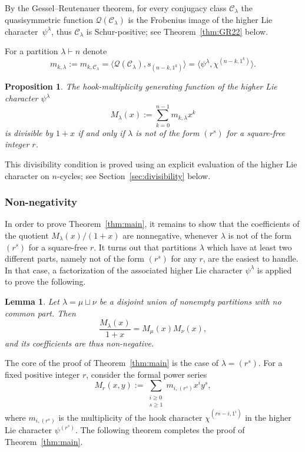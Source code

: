 \documentclass[10pt]{article}
\newtheorem{lemma}[theorem]{Lemma}
\newtheorem{proposition}[theorem]{Proposition}
\theoremstyle{definition}
\newcommand{\Q}{\mathcal Q}
\newcommand{\C}{\mathcal C}
\begin{document}
By the 
Gessel--Reutenauer theorem, 
for every conjugacy class $\C_\lambda$ 
the quasisymmetric function 
$\Q(\C_\lambda)$ is the Frobenius image of the higher Lie character~$\psi^\lambda$, thus  $\C_\lambda$ is  Schur-positive; 
see Theorem~\ref{thm:GR22} below.

For a partition $\lambda \vdash n$ denote
\begin{equation}\label{notation:m_k_hLc}
m_{k,\lambda} := m_{k,\C_\lambda}
= \langle \Q(\C_\lambda), s_{(n-k,1^k)} \rangle
= \langle \psi^\lambda, \chi^{(n-k,1^k)} \rangle.
\end{equation}
    
\begin{proposition}\label{prop:divisibility} 
    The hook-multiplicity generating function of the higher Lie character $\psi^\lambda$
    \[
        M_\lambda(x):=\sum\limits_{k=0}^{n-1}m_{k,\lambda}x^k
    \]
    is divisible by $1+x$ 
    if and only if $\lambda$ is not of the form $(r^s)$ for a square-free integer $r$.
\end{proposition}

This divisibility condition is proved using an explicit evaluation of the higher Lie character on $n$-cycles; see Section~\ref{sec:divisibility} below.

    
\subsubsection{Non-negativity} 

In order to prove Theorem~\ref{thm:main}, it remains to show that the coefficients of the quotient  $M_\lambda(x)/(1+x)$ are nonnegative, whenever $\lambda$ is not of the form $(r^s)$ for a square-free $r$. 
It turns out that partitions $\lambda$ which have at least two different parts, namely not of the form $(r^s)$ for any $r$, are the easiest to handle. 
In that case, a factorization of the associated higher Lie character $\psi^\lambda$ is applied to prove the following. 

\begin{lemma}\label{lem:distinct}
    Let $\lambda = \mu \sqcup \nu$ be a disjoint union of nonempty partitions with no common part. 
    Then
    \begin{equation}
        \frac{M_\lambda(x)}{1+x} = M_\mu(x) M_\nu(x),     
    \end{equation}
    and its coefficients are thus non-negative.
\end{lemma}	

The core of the proof of Theorem~\ref{thm:main} is 
the case of $\lambda = (r^s)$.
For a fixed positive integer $r$, consider the formal power series
\[
    M_r(x,y) := \sum_{\substack{i \ge 0 \\ s \ge 1}} m_{i,(r^s)} x^i y^s,
\]
where $m_{i,(r^s)}$ is the multiplicity of the hook character $\chi^{(rs-i,1^i)}$ in the higher Lie character $\psi^{(r^s)}$. 
The following theorem completes the proof of Theorem~\ref{thm:main}.
 
\end{document}
